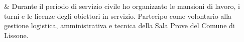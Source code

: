 & Durante il periodo di servizio civile ho organizzato le mansioni di lavoro, i turni e le licenze degli obiettori in servizio. Partecipo come volontario alla gestione logistica, amministrativa e tecnica della Sala Prove del Comune di Lissone.\\